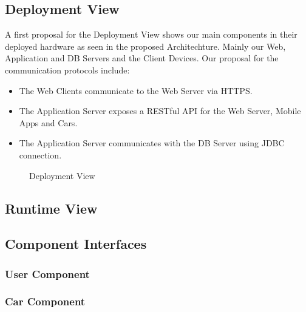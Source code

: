 \documentclass[a4paper]{article}
\begin{document}
\subsection{Deployment View}
A first proposal for the Deployment View shows our main components in their deployed hardware as seen in the proposed Architechture. Mainly our Web, Application and DB Servers and the Client Devices. Our proposal for the communication protocols include:
\begin{itemize} 
\item The Web Clients communicate to the Web Server via HTTPS. 
\item The Application Server exposes a RESTful API for the Web Server, Mobile Apps and Cars. 
\item The Application Server communicates with the DB Server using JDBC connection.
\end{itemize}
\begin{figure}[h]
\centering
\vspace*{\fill}
\noindent{}%
\caption {Deployment View}
\vspace*{0.5cm}
\end{figure}
\newpage

\subsection{Runtime View}

\newpage
\subsection{Component Interfaces}

\subsubsection{User Component}
\begin{figure}[h]
\centering
\vspace*{\fill}
\noindent{}%
\vspace*{0.25cm}
\end{figure}

\subsubsection{Car Component}
\begin{figure}[h]
\centering
\vspace*{\fill}
\noindent{}%
\vspace*{0.25cm}
\end{figure}
\end{document}
